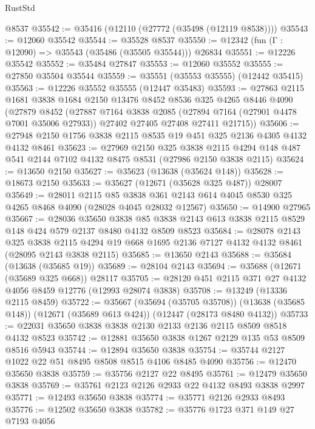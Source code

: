 \begin{lexlean}{RustStd}
\begin{coremodule}
    @8537
@35542 := @35416 (@12110 (@27772 (@35498 (@12119 @8538))))
@35543 := @12060 @35542
@35544 := @35528 @8537
@35550 := @12342 (fun (Γ : @12090) => @35543 (@35486 (@35505 @35544))) @26834
@35551 := @12226 @35542
@35552 := @35484 @27847
@35553 := @12060 @35552
@35555 := @27850 @35504 @35544
@35559 := @35551 (@35553 @35555) (@12442 @35415)
@35563 := @12226 @35552 @35555 (@12447 @35483)
@35593 := @27863
    @2115
    @1681
    @3838
    @1684
    @2150
    @13476
    @8452
    @8536
    @325
    @4265
    @8446
    @4090
    (@27879
      @8452
      (@27887
        @7164
        @3838
        @2085
        (@27894 @7164 (@27901 @4478 @7001 @35006 @27933))
        @27402
        @27405
        @27408
        @27411
        @21715))
@35606 := @27948 @2150 @1756 @3838 @2115 @8535 @19 @451 @325 @2136 @4305 @4132 @4132 @8461
@35623 := @27969
    @2150
    @325
    @3838
    @2115
    @4294
    @148
    @487
    @541
    @2144
    @7102
    @4132
    @8475
    @8531
    (@27986 @2150 @3838 @2115)
@35624 := @13650 @2150
@35627 := @35623 (@13638 (@35624 @148))
@35628 := @18673 @2150
@35633 := @35627 (@12671 (@35628 @325 @487)) @28007
@35649 := @28011
    @2115
    @85
    @3838
    @361
    @2143
    @614
    @4045
    @8530
    @325
    @4265
    @8468
    @4090
    (@28028 @4045 @28032 @12567)
@35650 := @14900 @27965
@35667 := @28036
    @35650
    @3838
    @85
    @3838
    @2143
    @613
    @3838
    @2115
    @8529
    @148
    @424
    @579
    @2137
    @8480
    @4132
    @8509
    @8523
@35684 := @28078
    @2143
    @325
    @3838
    @2115
    @4294
    @19
    @668
    @1695
    @2136
    @7127
    @4132
    @4132
    @8461
    (@28095 @2143 @3838 @2115)
@35685 := @13650 @2143
@35688 := @35684 (@13638 (@35685 @19))
@35689 := @28104 @2143
@35694 := @35688 (@12671 (@35689 @325 @668)) @28117
@35705 := @28120 @451 @2115 @371 @27 @4132 @4056 @8459 @12776 (@12993 @28074 @3838)
@35708 := @13249 (@13336 @2115 @8459)
@35722 := @35667
    (@35694 (@35705 @35708))
    (@13638 (@35685 @148))
    (@12671 (@35689 @613 @424))
    (@12447 (@28173 @8480 @4132))
@35733 := @22031 @35650 @3838 @3838 @2130 @2133 @2136 @2115 @8509 @8518 @4132 @8523
@35742 := @12881 @35650 @3838 @1267 @2129 @135 @53 @8509 @8516 @5943
@35744 := @12894 @35650 @3838
@35754 := @35744 @2127 @1022 @22 @51 @8495 @8508 @8515 @4106 @8485 @4090
@35756 := @12470 @35650 @3838
@35759 := @35756 @2127 @22 @8495
@35761 := @12479 @35650 @3838
@35769 := @35761 @2123 @2126 @2933 @22 @4132 @8493 @3838 @2997
@35771 := @12493 @35650 @3838
@35774 := @35771 @2126 @2933 @8493
@35776 := @12502 @35650 @3838
@35782 := @35776 @1723 @371 @149 @27 @7193 @4056

\end{coremodule}
\end{lexlean}
